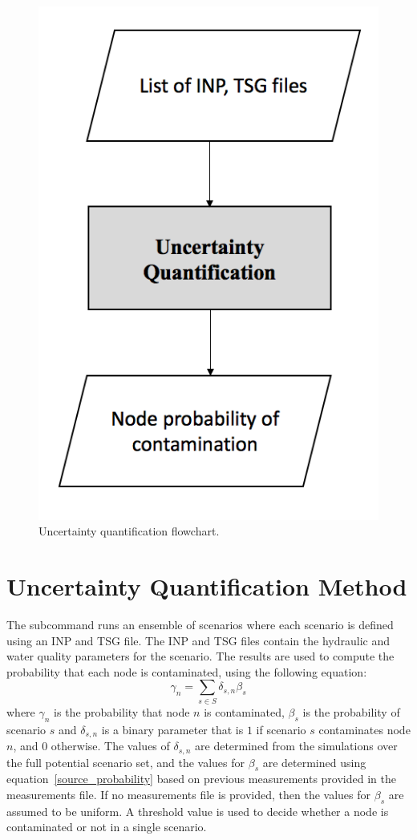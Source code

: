 \begin{figure}[h]
	\centering
	\includegraphics[scale=0.30]{graphics/uq_flowchart.png}
	\caption{Uncertainty quantification flowchart.}
	\label{fig:uq_flowchart}
\end{figure}

\section{Uncertainty Quantification Method}\label{uqn_algorithms}
The  subcommand runs an ensemble of scenarios where each scenario is defined using an INP and TSG file. The INP and TSG files 
contain the hydraulic and water quality parameters for the scenario.  
The results are used to compute the probability that each node is contaminated, using the following equation:
\begin{equation}
\gamma_n = \sum_{s \in S} \delta_{s,n}\beta_s
\label{nodeprob}
\end{equation}
where $\gamma_n $ is the probability that node $n$ is contaminated, $\beta_s$ is the probability of scenario $s$ and $\delta_{s,n}$ is a binary parameter that is $1$ if scenario $s$ contaminates node $n$, and $0$ otherwise. The values of $\delta_{s,n}$ are determined from the simulations over the full potential scenario set, and the values for $\beta_s$ are determined using equation~\eqref{source_probability} based on previous measurements provided in the measurements file. If no measurements file is provided, then the values for $\beta_s$ are assumed to be uniform. A threshold value is used to decide whether a node is contaminated or not in a single scenario.

